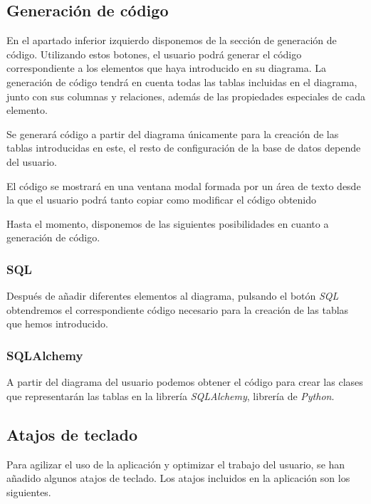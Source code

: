 \subsection{Generación de código}


En el apartado inferior izquierdo disponemos de la sección de generación de código. Utilizando estos botones, el usuario podrá generar el código correspondiente a los elementos que haya introducido en su diagrama. La generación de código tendrá en cuenta todas las tablas incluidas en el diagrama, junto con sus columnas y relaciones, además de las propiedades especiales de cada elemento.

Se generará código a partir del diagrama únicamente para la creación de las tablas introducidas en este, el resto de configuración de la base de datos depende del usuario.

El código se mostrará en una ventana modal formada por un área de texto desde la que el usuario podrá tanto copiar como modificar el código obtenido

Hasta el momento, disponemos de las siguientes posibilidades en cuanto a generación de código.

\subsubsection{SQL}

Después de añadir diferentes elementos al diagrama, pulsando el botón \emph{SQL} obtendremos el correspondiente código necesario para la creación de las tablas que hemos introducido.

\subsubsection{SQLAlchemy}

A partir del diagrama del usuario podemos obtener el código para crear las clases que representarán las tablas en la librería \emph{SQLAlchemy}, librería de \emph{Python}.

\subsection{Atajos de teclado}

Para agilizar el uso de la aplicación y optimizar el trabajo del usuario, se han añadido algunos atajos de teclado. Los atajos incluidos en la aplicación son los siguientes.

